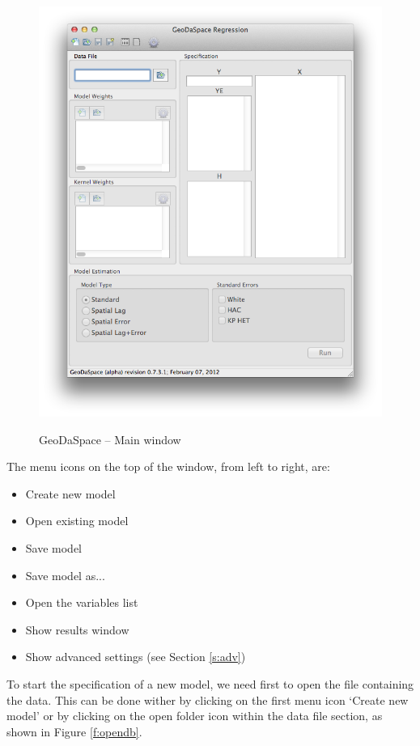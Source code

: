\documentclass{article}
\begin{document}
\begin{figure}[htb]
\caption{GeoDaSpace -- Main window}
\label{f:gui}
\begin{center}
\includegraphics[width=0.8\linewidth]{GUI.png}\\
\end{center}
\end{figure}

The menu icons on the top of the window, from left to right, are:
\begin{itemize}
\item Create new model
\item Open existing model
\item Save model
\item Save model as...
\item Open the variables list
\item Show results window
\item Show advanced settings (see Section \ref{s:adv})
\end{itemize}

To start the specification of a new model, we need first to open the file containing the data. This can be done wither by clicking on the first menu icon `Create new model' or by clicking on the open folder icon within the data file section, as shown in Figure \ref{f:opendb}.
\end{document}
